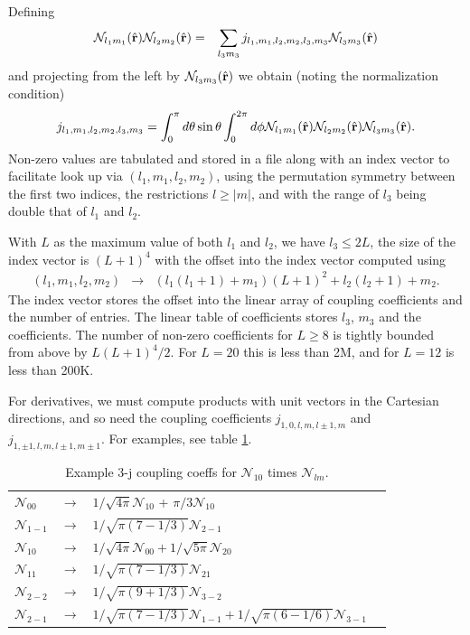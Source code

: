 \documentclass[12pt]{article}
\newcommand{\N}{\mathcal{N}}
\newcommand{\rv}{\vb{r}}
\newcommand{\rhat}{\hat{\rv}}
\begin{document}
Defining 
\begin{eqnarray}
  \N_{l_1 m_1}(\rhat) \N_{l_2 m_2}(\rhat) & = & \sum_{l_3 m_3} j_{l_1, m_1, l_2, m_2, l_3, m_3} \N_{l_3 m_3}(\rhat)
\end{eqnarray}
and projecting from the left by $\N_{l_3 m_3}(\rhat)$ we obtain (noting the normalization condition)
\begin{eqnarray}
  j_{l_1, m_1, l_2, m_2, l_3, m_3} = \int_0^\pi d\theta \sin \theta \int_0^{2 \pi} d\phi \N_{l_1 m_1}(\rhat) \N_{l_2 m_2}(\rhat) \N_{l_3 m_3}(\rhat) .
\end{eqnarray}
Non-zero values are tabulated and stored in a file along with an index vector to facilitate look up via $(l_1, m_1, l_2, m_2)$, using the permutation symmetry between the first two indices, the restrictions $l \ge |m|$, and with the range of $l_3$ being double that of $l_1$ and $l_2$.

With $L$ as the maximum value of both $l_1$ and $l_2$, we have $l_3 \le 2 L$, the size of the index vector is $(L+1)^4$ with the offset into the index vector computed using
\begin{eqnarray}
  (l_1, m_1, l_2, m_2) & \rightarrow & (l_1 (l_1+1)+m_1) (L+1)^2 + l_2 (l_2+1)+m_2 .
\end{eqnarray}
The index vector stores the offset into the linear array of coupling coefficients and the number of entries.  The linear table of coefficients stores $l_3$, $m_3$ and the coefficients.
The number of non-zero coefficients for $L \ge 8$ is tightly bounded from above by $L (L+1)^4 / 2$. For $L=20$ this is less than 2M, and for $L=12$ is less than 200K.

For derivatives, we must compute products with unit vectors in the Cartesian directions, and so need the coupling coefficients $j_{1, 0, l, m, l\pm 1, m}$ and $j_{1, \pm 1, l, m, l\pm 1, m\pm 1}$.  For examples, see table \ref{tab:3j10}.
\begin{table}
  \caption{Example 3-j coupling coeffs for $\N_{10}$ times $\N_{lm}$.} \label{tab:3j10}
  \begin{center}    
  \begin{tabular}{lcll}
$\N_{00}$  &   $\rightarrow$ &  $ 1/\sqrt{4 \pi} \N_{10} $ +  $\pi/3 \N_{10}$\\
$\N_{1 -1}$&   $\rightarrow$ &  $1/\sqrt{\pi (7-1/3)} \N_{2 -1}$  \\
$\N_{10}$ & $\rightarrow$ &  $1/\sqrt{4 \pi}  \N_{0 0} +   1/\sqrt{5 \pi} \N_{2 0}$ \\
$\N_{11}$ &  $\rightarrow$ &   $1/\sqrt{\pi (7-1/3)} \N_{2 1}$ \\
$\N_{2-2}$& $\rightarrow$ &  $1/\sqrt{\pi (9+1/3)} \N_{3 -2}$ \\
$\N_{2-1}$& $\rightarrow$ &  $1/\sqrt{\pi (7-1/3)} \N_{1 -1} +  1/\sqrt{\pi (6-1/6)} \N_{3 -1} $
  \end{tabular}
  \end{center}
\end{table}
\end{document}
